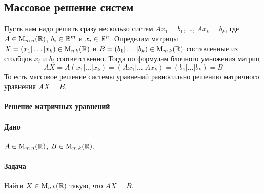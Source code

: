 \subsection{Массовое решение систем}

Пусть нам надо решить сразу несколько систем $Ax_1 = b_1$, \ldots, $Ax_k = b_k$, где $A\in \operatorname{M}_{m\,n}(\mathbb R)$, $b_i\in \mathbb R^{m}$ и $x_i\in \mathbb R^{n}$. Определим матрицы $X = (x_1|\ldots|x_k)\in \operatorname{M}_{n\,k}(\mathbb R)$ и $B = (b_1|\ldots|b_k)\in \operatorname{M}_{m\,k}(\mathbb R)$ составленные из столбцов $x_i$ и $b_i$ соответственно. Тогда по формулам блочного умножения матриц
\[
AX = A(x_1|\ldots|x_k) = (Ax_1|\ldots|Ax_k) = (b_1|\ldots|b_k) = B
\]
То есть массовое решение системы уравнений равносильно решению матричного уравнения $AX = B$.

\paragraph{Решение матричных уравнений}

\paragraph{Дано} $A\in \operatorname{M}_{m\,n}(\mathbb R)$, $B\in \operatorname{M}_{m\,k}(\mathbb R)$.

\paragraph{Задача} Найти $X\in \operatorname{M}_{n\,k}(\mathbb R)$ такую, что $AX = B$.

